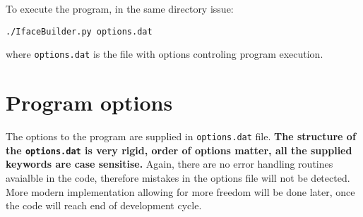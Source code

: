 \documentclass[a4paper,12pt,oneside]{article}
\begin{document}
\noindent
To execute the program, in the same directory issue:
\begin{verbatim}
./IfaceBuilder.py options.dat
\end{verbatim}
where \texttt{options.dat} is the file with options controling program
execution.

\section{Program options}
The options to the program are supplied in \texttt{options.dat} file.
\textbf{The structure of the \texttt{options.dat} is very rigid, order of
options matter, all the supplied keywords are case sensitise.} Again, there are
no error handling routines avaialble in the code, therefore mistakes
in the
options file will not be detected. More modern
implementation allowing for more freedom will be done later, once the code will
reach end of development cycle.
\end{document}

